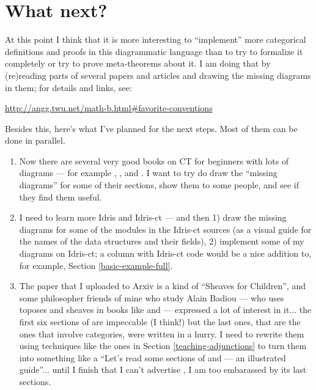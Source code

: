 \documentclass[oneside,12pt]{article}
\begin{document}
%                                                   

\section{What next? \DONE}
\label{what-next}

At this point I think that it is more interesting to ``implement''
more categorical definitions and proofs in this diagrammatic language
than to try to formalize it completely or try to prove meta-theorems
about it. I am doing that by (re)reading parts of several papers and
articles and drawing the missing diagrams in them; for details and
links, see:

\msk

\centerline{\url{http://angg.twu.net/math-b.html\#favorite-conventions}}

\msk

Besides this, here's what I've planned for the next steps. Most of
them can be done in parallel.

\begin{enumerate}

\item Now there are several very good books on CT for beginners with
  lots of diagrams --- for example \cite{FongSpivak}, \cite{Perrone},
  and \cite{MilewskiCTFPOCaml}. I want to try do draw the ``missing
  diagrams'' for some of their sections, show them to some people, and
  see if they find them useful.

\item I need to learn more Idris and Idris-ct --- and then 1) draw the
  missing diagrams for some of the modules in the Idris-ct sources (as
  a visual guide for the names of the data structures and their
  fields), 2) implement some of my diagrams on Idris-ct; a column with
  Idris-ct code would be a nice addition to, for example, Section
  \ref{basic-example-full}.

\item The paper \cite{PH2} that I uploaded to Arxiv is a kind of
  ``Sheaves for Children'', and some philosopher friends of mine who
  study Alain Badiou --- who uses toposes and sheaves in books like
  \cite{BadiouLoW} and \cite{BadiouMoTT} --- expressed a lot of
  interest in it... the first six sections of \cite{PH2} are
  impeccable (I think!) but the last ones, that are the ones that
  involve categories, were written in a hurry. I need to rewrite them
  using techniques like the ones in Section \ref{teaching-adjunctions}
  to turn them into something like a ``Let's read some sections of
  \cite{Elephant1} and \cite{Riehl} --- an illustrated guide''...
  until I finish that I can't advertise \cite{PH2}, I am too
  embarassed by its last sections.

\end{enumerate}
\end{document}
